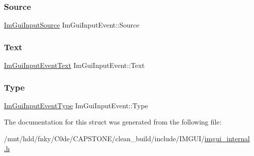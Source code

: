 \mbox{\label{structImGuiInputEvent_a8780562e8dbed9ae613760399e8be8df}} 
\subsubsection{\texorpdfstring{Source}{Source}}
{\footnotesize\ttfamily \hyperlink{imgui__internal_8h_a8ee603a145a3a4f4ab5c93c8c8333b78}{Im\+Gui\+Input\+Source} Im\+Gui\+Input\+Event\+::\+Source}

\mbox{\label{structImGuiInputEvent_aae5e3f7f631cef154a0831e89f608655}} 
\subsubsection{\texorpdfstring{Text}{Text}}
{\footnotesize\ttfamily \hyperlink{structImGuiInputEventText}{Im\+Gui\+Input\+Event\+Text} Im\+Gui\+Input\+Event\+::\+Text}

\mbox{\label{structImGuiInputEvent_a21d31c722ff155e2e8896a8012850acd}} 
\subsubsection{\texorpdfstring{Type}{Type}}
{\footnotesize\ttfamily \hyperlink{imgui__internal_8h_a8baf1d40f4b383b021ecbc6719a69aec}{Im\+Gui\+Input\+Event\+Type} Im\+Gui\+Input\+Event\+::\+Type}



The documentation for this struct was generated from the following file\+:\begin{DoxyCompactItemize}
\item 
/mnt/hdd/fnky/\+C0de/\+C\+A\+P\+S\+T\+O\+N\+E/clean\+\_\+build/include/\+I\+M\+G\+U\+I/\hyperlink{imgui__internal_8h}{imgui\+\_\+internal.\+h}\end{DoxyCompactItemize}

